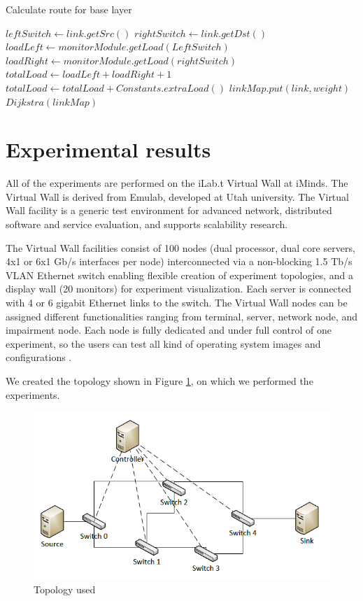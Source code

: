 \documentclass[conference]{IEEEtran}
\begin{document}
\begin{algorithm}
\caption{Calculate route for base layer}
\label{alg2}
\begin{algorithmic}
\STATE $leftSwitch \leftarrow link.getSrc()$
\STATE $rightSwitch \leftarrow link.getDst()$
\STATE $loadLeft \leftarrow monitorModule.getLoad(LeftSwitch)$
\STATE $loadRight \leftarrow monitorModule.getLoad(rightSwitch)$
\STATE $totalLoad \leftarrow loadLeft + loadRight + 1$
\STATE $totalLoad \leftarrow totalLoad + Constants.extraLoad()$
\ENDIF
\STATE $linkMap.put(link,weight)$
\ENDFOR
$Dijkstra(linkMap)$
\end{algorithmic}
\end{algorithm}

\section{Experimental results}

All of the experiments are performed on the iLab.t Virtual Wall at iMinds.
The Virtual Wall is derived from Emulab, developed at Utah university.
The Virtual Wall facility is a generic test environment for advanced network, 
distributed software and service evaluation, and supports scalability research.

The Virtual Wall facilities consist of 100 nodes 
(dual processor, dual core servers, 4x1 or 6x1 Gb/s interfaces per node)
interconnected via a non-blocking 1.5 Tb/s VLAN Ethernet switch enabling flexible creation of experiment topologies, 
and a display wall (20 monitors) for experiment visualization. 
Each server is connected with 4 or 6 gigabit Ethernet links to the switch. 
The Virtual Wall nodes can be assigned different functionalities ranging 
from terminal, server, network node, and impairment node. 
Each node is fully dedicated and under full control of one experiment, 
so the users can test all kind of operating system images and configurations \cite{virtual}.

We created the topology shown in Figure \ref{fig:topology}, on which we performed the experiments.

\begin{figure}[htb]
\centering
\includegraphics[scale=0.4]{fig/topology}
\caption{Topology used}
\label{fig:topology}
\end{figure}
\end{document}
